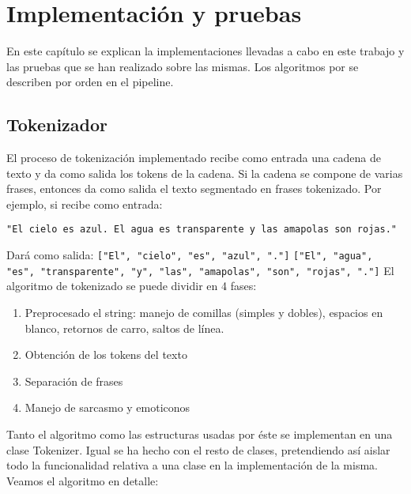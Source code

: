 \chapter{Implementación y pruebas}
\label{conclusion}

En este capítulo se explican la implementaciones llevadas a cabo en este trabajo y las pruebas que se han realizado sobre las mismas. Los algoritmos por se describen por orden en el pipeline. 
\section{Tokenizador}
El proceso de tokenización implementado recibe como entrada una cadena de texto y da como salida los tokens de la cadena. Si la cadena se compone de varias frases, entonces da como salida el texto segmentado en frases tokenizado. Por ejemplo, si recibe como entrada: \newline
\begin{center}\texttt{"El cielo es azul. El agua es transparente y las amapolas son rojas."}
\end{center}
Dará como salida:
 \texttt{["El", "cielo", "es", "azul", "."]} \newline
\texttt{["El", "agua", "es", "transparente", "y", "las", "amapolas", "son", "rojas", "."]}\newline
El algoritmo de tokenizado se puede dividir en 4 fases:
\begin{enumerate}
\item Preprocesado el string: manejo de comillas (simples y dobles), espacios en blanco, retornos de carro, saltos de línea.
\item Obtención de los tokens del texto
\item Separación de frases
\item Manejo de sarcasmo y emoticonos
\end{enumerate}

Tanto el algoritmo como las estructuras usadas por éste se implementan en una clase \textcolor{SchoolColor}{Tokenizer}. Igual se ha hecho con el resto de clases, pretendiendo así aislar todo la funcionalidad relativa a una clase en la implementación de la misma. Veamos el algoritmo en detalle:
